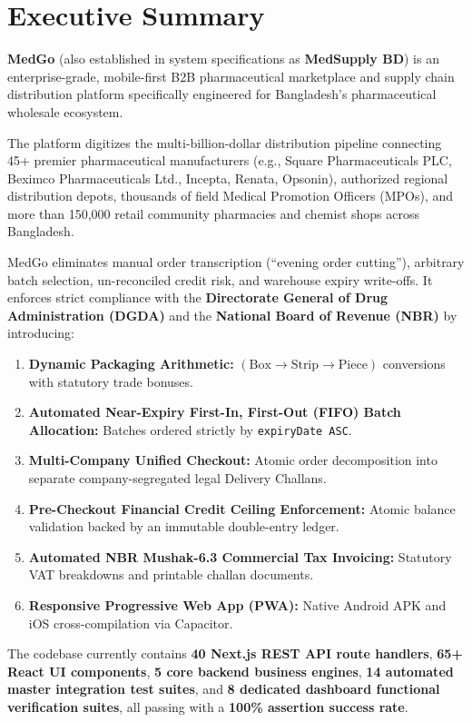 \documentclass[10pt,a4paper]{article}
\begin{document}
\section{Executive Summary}
\textbf{MedGo} (also established in system specifications as \textbf{MedSupply BD}) is an enterprise-grade, mobile-first B2B pharmaceutical marketplace and supply chain distribution platform specifically engineered for Bangladesh's pharmaceutical wholesale ecosystem.

The platform digitizes the multi-billion-dollar distribution pipeline connecting 45+ premier pharmaceutical manufacturers (e.g., Square Pharmaceuticals PLC, Beximco Pharmaceuticals Ltd., Incepta, Renata, Opsonin), authorized regional distribution depots, thousands of field Medical Promotion Officers (MPOs), and more than 150,000 retail community pharmacies and chemist shops across Bangladesh.

MedGo eliminates manual order transcription (``evening order cutting''), arbitrary batch selection, un-reconciled credit risk, and warehouse expiry write-offs. It enforces strict compliance with the \textbf{Directorate General of Drug Administration (DGDA)} and the \textbf{National Board of Revenue (NBR)} by introducing:
\begin{enumerate}[leftmargin=*]
    \item \textbf{Dynamic Packaging Arithmetic:} $(\text{Box} \to \text{Strip} \to \text{Piece})$ conversions with statutory trade bonuses.
    \item \textbf{Automated Near-Expiry First-In, First-Out (FIFO) Batch Allocation:} Batches ordered strictly by \texttt{expiryDate ASC}.
    \item \textbf{Multi-Company Unified Checkout:} Atomic order decomposition into separate company-segregated legal Delivery Challans.
    \item \textbf{Pre-Checkout Financial Credit Ceiling Enforcement:} Atomic balance validation backed by an immutable double-entry ledger.
    \item \textbf{Automated NBR Mushak-6.3 Commercial Tax Invoicing:} Statutory VAT breakdowns and printable challan documents.
    \item \textbf{Responsive Progressive Web App (PWA):} Native Android APK and iOS cross-compilation via Capacitor.
\end{enumerate}

The codebase currently contains \textbf{40 Next.js REST API route handlers}, \textbf{65+ React UI components}, \textbf{5 core backend business engines}, \textbf{14 automated master integration test suites}, and \textbf{8 dedicated dashboard functional verification suites}, all passing with a \textbf{100\% assertion success rate}.
\end{document}
